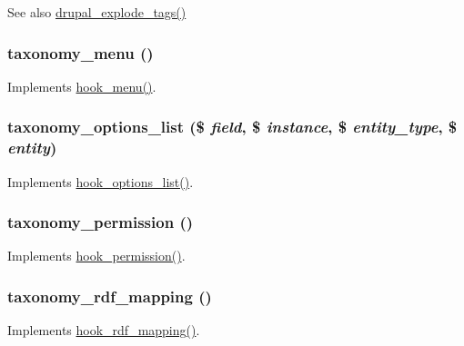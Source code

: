 \begin{DoxySeeAlso}{See also}
\hyperlink{common_8inc_ae5bd302bab285bc819a70737f6121953}{drupal\_\-explode\_\-tags()} 
\end{DoxySeeAlso}
\hypertarget{taxonomy_8module_a256fff9f5fb7e3f68d2cb9e82d35b68c}{
\subsubsection[{taxonomy\_\-menu}]{\setlength{\rightskip}{0pt plus 5cm}taxonomy\_\-menu ()}}
\label{taxonomy_8module_a256fff9f5fb7e3f68d2cb9e82d35b68c}
Implements \hyperlink{group__hooks_ga5c95244fea59b25666e409759e133ded}{hook\_\-menu()}. \hypertarget{taxonomy_8module_abe1a35a814483b668aeb2236c85dadff}{
\subsubsection[{taxonomy\_\-options\_\-list}]{\setlength{\rightskip}{0pt plus 5cm}taxonomy\_\-options\_\-list (\$ {\em field}, \/  \$ {\em instance}, \/  \$ {\em entity\_\-type}, \/  \$ {\em entity})}}
\label{taxonomy_8module_abe1a35a814483b668aeb2236c85dadff}
Implements \hyperlink{options_8api_8php_aa25d7440810f3dc0c137ef0e5747b485}{hook\_\-options\_\-list()}. \hypertarget{taxonomy_8module_a700f0b6c1619798c550d5ffffbd25a35}{
\subsubsection[{taxonomy\_\-permission}]{\setlength{\rightskip}{0pt plus 5cm}taxonomy\_\-permission ()}}
\label{taxonomy_8module_a700f0b6c1619798c550d5ffffbd25a35}
Implements \hyperlink{group__hooks_ga2b22b45f4925f2478412477bae329713}{hook\_\-permission()}. \hypertarget{taxonomy_8module_a319b54e0e77df84f22c4a61fca2d93e5}{
\subsubsection[{taxonomy\_\-rdf\_\-mapping}]{\setlength{\rightskip}{0pt plus 5cm}taxonomy\_\-rdf\_\-mapping ()}}
\label{taxonomy_8module_a319b54e0e77df84f22c4a61fca2d93e5}
Implements \hyperlink{group__rdf_gae3e7f047bdcb9309b323e2af09966765}{hook\_\-rdf\_\-mapping()}.

